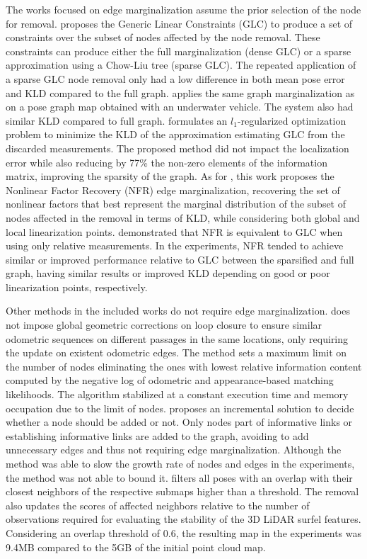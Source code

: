 The works focused on edge marginalization assume the prior selection of the node for removal.
\cite{carlevaris-bianco-et-al:2014:2347571} proposes the Generic Linear Constraints (GLC) to produce a set of constraints over the subset of nodes affected by the node removal. These constraints can produce either the full marginalization (dense GLC) or a sparse approximation using a Chow-Liu tree (sparse GLC). The repeated application of a sparse GLC node removal only had a low difference in both mean pose error and KLD compared to the full graph.
\cite{ozog-et-al:2016:21582} applies the same graph marginalization as \cite{carlevaris-bianco-et-al:2014:2347571} on a pose graph map obtained with an underwater vehicle. The system also had similar KLD compared to full graph.
\cite{huang-et-al:2013:6698835} formulates an $l_1$-regularized optimization problem to minimize the KLD of the approximation estimating GLC from the discarded measurements. The proposed method did not impact the localization error while also reducing by 77\% the non-zero elements of the information matrix, improving the sparsity of the graph.
As for \cite{mazuran-et-al:2016:0278364915581629}, this work proposes the Nonlinear Factor Recovery (NFR) edge marginalization, recovering the set of nonlinear factors that best represent the marginal distribution of the subset of nodes affected in the removal in terms of KLD, while considering both global and local linearization points. \cite{mazuran-et-al:2016:0278364915581629} demonstrated that NFR is equivalent to GLC when using only relative measurements. In the experiments, NFR tended to achieve similar or improved performance relative to GLC between the sparsified and full graph, having similar results or improved KLD depending on good or poor linearization points, respectively.

Other methods in the included works do not require edge marginalization.
\cite{maddern-et-al:2012:6224622} does not impose global geometric corrections on loop closure to ensure similar odometric sequences on different passages in the same locations, only requiring the update on existent odometric edges. The method sets a maximum limit on the number of nodes eliminating the ones with lowest relative information content computed by the negative log of odometric and appearance-based matching likelihoods. The algorithm stabilized at a constant execution time and memory occupation due to the limit of nodes.
\cite{ila-et-al:2017:0278364917691110} proposes an incremental solution to decide whether a node should be added or not. Only nodes part of informative links or establishing informative links are added to the graph, avoiding to add unnecessary edges and thus not requiring edge marginalization. Although the method was able to slow the growth rate of nodes and edges in the experiments, the method was not able to bound it.
\cite{egger-et-al:2018:8593854} filters all poses with an overlap with their closest neighbors of the respective submaps higher than a threshold. The removal also updates the scores of affected neighbors relative to the number of observations required for evaluating the stability of the 3D LiDAR surfel features. Considering an overlap threshold of 0.6, the resulting map in the experiments was 9.4MB compared to the 5GB of the initial point cloud map.


